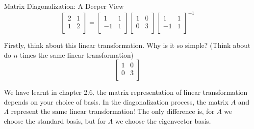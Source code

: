 \documentclass{beamer}
\begin{document}
\begin{frame}{Matrix Diagonalization: A Deeper View}
    \begin{equation*}
        \left[ \begin{matrix}
            2&		1\\
            1&		2\\
        \end{matrix} \right] =\left[ \begin{matrix}
            1&		1\\
            -1&		1\\
        \end{matrix} \right] \left[ \begin{matrix}
            1&		0\\
            0&		3\\
        \end{matrix} \right] \left[ \begin{matrix}
            1&		1\\
            -1&		1\\
        \end{matrix} \right] ^{-1}
    \end{equation*}

Firstly, think about this linear transformation. Why is it so simple? (Think about do $n$ times the same linear transformation)
\begin{equation*}
    \left[ \begin{matrix}
        1&		0\\
        0&		3\\
    \end{matrix} \right]
\end{equation*}

We have learnt in chapter 2.6, the matrix representation of linear transformation depends on your choice of basis. In the diagonalization process, the matrix $A$ and $\varLambda$ represent the same linear transformation! The only difference is, for $A$ we choose the standard basis, but for $\varLambda$ we choose the eigenvector basis.
\end{frame}
\end{document}

